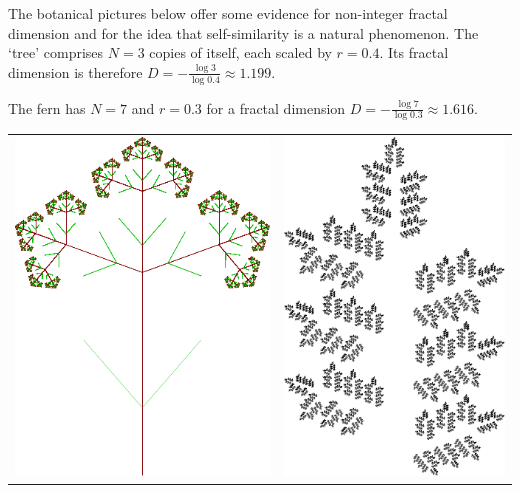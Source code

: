 \begin{example}{}{}
	The botanical pictures below offer some evidence for non-integer fractal dimension and for the idea that self-similarity is a natural phenomenon. The `tree' comprises $N=3$ copies of itself, each scaled by $r=0.4$. Its fractal dimension is therefore $D=-\frac{\log 3}{\log 0.4}\approx 1.199$.\par
	The fern has $N=7$ and $r=0.3$ for a fractal dimension $D=-\frac{\log 7}{\log 0.3}\approx 1.616$.
	\begin{center}
		\begin{tabular}{c@{\qquad\qquad}c}
			\includegraphics{tree2}
			&
			\href{http://www.math.uci.edu/~ndonalds/math161/fern-code.html}{\includegraphics{tree3}}

\end{tabular}
\end{center}
\end{example}
